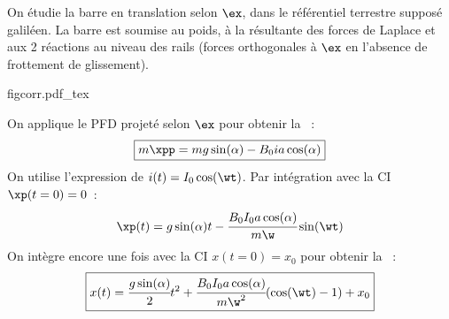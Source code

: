 \documentclass[11pt]{book}
\newcommand{\figsvg}[1]{
  \begin{center}
    {#1}
  \end{center}
}
\begin{document}
{\begin{enumerate}
		 On étudie la barre en translation selon $\ex$, dans le référentiel
		terrestre supposé galiléen.
		\smallbreak
		La barre est soumise au poids, à la résultante des forces de Laplace et
		aux 2 réactions au niveau des rails (forces orthogonales à $\ex$ en
		l'absence de frottement de glissement).
		\figsvg{figcorr.pdf_tex}
		On applique le PFD projeté selon $\ex$ pour obtenir la ~:
		\[
			\boxed{m\xpp=mg\sin(\alpha)-B_0ia\cos(\alpha)}
		\]
		 On utilise l'expression de $i(t)=I_0\cos(\wt)$.
		\smallbreak
		Par intégration avec la CI $\xp(t=0)=0$~:
		\[
			\xp(t)=g\sin(\alpha)t-\cfrac{B_0I_0a\cos(\alpha)}{m\w}\sin(\wt)
		\]
		On intègre encore une fois avec la CI $x(t=0)=x_0$ pour obtenir la
		~:
		\[
			\boxed{x(t)=\cfrac{g\sin(\alpha)}{2}t^2+
			\cfrac{B_0I_0a\cos(\alpha)}{m\w^2}(\cos(\wt)-1)+x_0}
		\]
	\end{enumerate}
}
\end{document}
